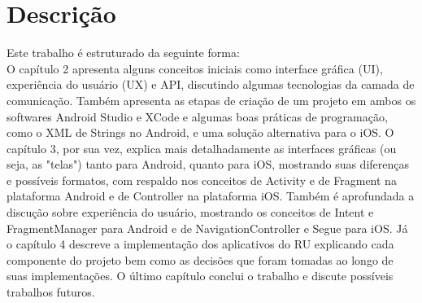 \section{Descrição}
Este trabalho é estruturado da seguinte forma:\\
O capítulo 2 apresenta alguns conceitos iniciais como interface gráfica 
(UI), experiência do usuário (UX) e API, discutindo algumas tecnologias da camada de 
comunicação. Também apresenta as etapas de criação de um projeto em ambos os softwares Android 
Studio e XCode e algumas boas práticas de programação, como o XML de Strings no Android, 
e uma solução alternativa para o iOS.
O capítulo 3, por sua vez, explica mais detalhadamente as interfaces gráficas (ou seja, as "telas")
tanto para Android, quanto para iOS, mostrando suas diferenças e possíveis 
formatos, com respaldo nos conceitos de Activity e de Fragment na plataforma Android e de 
Controller na plataforma iOS. Também é aprofundada a discução sobre
 experiência do usuário, mostrando os conceitos de Intent e FragmentManager para Android e de 
 NavigationController e Segue para iOS.
Já o capítulo 4 descreve a implementação dos aplicativos do RU explicando cada 
componente do projeto bem como as decisões que foram tomadas ao longo de suas implementações.
O último capítulo conclui o trabalho e discute possíveis trabalhos futuros.